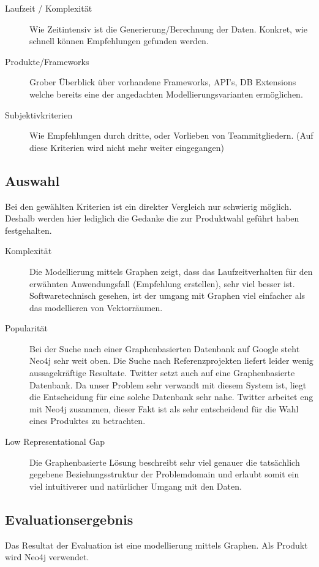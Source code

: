 \documentclass[10pt,a4paper]{scrartcl}
\begin{document}
\begin{description}
	\item[Laufzeit / Komplexität]
	Wie Zeitintensiv ist die Generierung/Berechnung der Daten. Konkret, wie schnell können Empfehlungen gefunden werden.
	\item[Produkte/Frameworks]Grober Überblick über vorhandene Frameworks, API's, DB Extensions welche bereits eine der angedachten Modellierungsvarianten ermöglichen.
	\item[Subjektivkriterien]Wie Empfehlungen durch dritte, oder Vorlieben von Teammitgliedern. (Auf diese Kriterien wird nicht mehr weiter eingegangen)
\end{description}

\subsection{Auswahl}
Bei den gewählten Kriterien ist ein direkter Vergleich nur schwierig möglich. Deshalb werden hier lediglich die Gedanke die zur Produktwahl geführt haben festgehalten.

\begin{description}
	\item[Komplexität] Die Modellierung mittels Graphen zeigt, dass das Laufzeitverhalten für den erwähnten Anwendungsfall (Empfehlung erstellen), sehr viel besser ist. Softwaretechnisch  gesehen, ist der umgang mit Graphen viel einfacher als das modellieren von Vektorräumen.
	\item[Popularität]
	Bei der Suche nach einer Graphenbasierten Datenbank auf Google steht Neo4j sehr weit oben. Die Suche nach Referenzprojekten liefert leider wenig aussagekräftige Resultate. Twitter setzt auch auf eine Graphenbasierte Datenbank. Da unser Problem sehr verwandt mit diesem System ist, liegt die Entscheidung für eine solche Datenbank sehr nahe. Twitter arbeitet eng mit Neo4j zusammen, dieser Fakt ist als sehr entscheidend für die Wahl eines Produktes zu betrachten.
	\item[Low Representational Gap]
	Die Graphenbasierte Lösung beschreibt sehr viel genauer die tatsächlich gegebene Beziehungsstruktur der Problemdomain und erlaubt somit ein viel intuitiverer und natürlicher Umgang mit den Daten.

\end{description}

\subsection{Evaluationsergebnis}
Das Resultat der Evaluation ist eine modellierung mittels Graphen. Als Produkt wird Neo4j verwendet.
\end{document}
